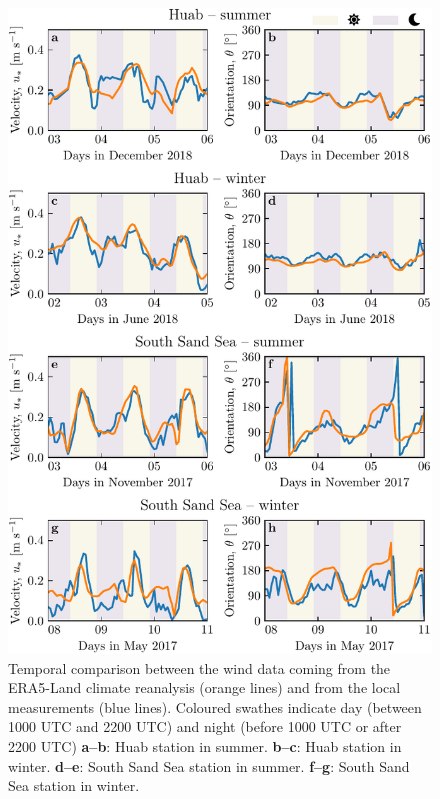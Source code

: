 \begin{figure}
\centering
\includegraphics[scale=1]{Figures/Figure6_supp.pdf}
\caption{Temporal comparison between the wind data coming from the ERA5-Land climate reanalysis (orange lines) and from the local measurements (blue lines). Coloured swathes indicate day (between 1000 UTC and 2200 UTC) and night (before 1000 UTC or after 2200 UTC) \textbf{a--b}: Huab station in summer. \textbf{b--c}: Huab station in winter. \textbf{d--e}: South Sand Sea station in summer. \textbf{f--g}: South Sand Sea station in winter.}
\label{Fig6_supp}
\end{figure}

